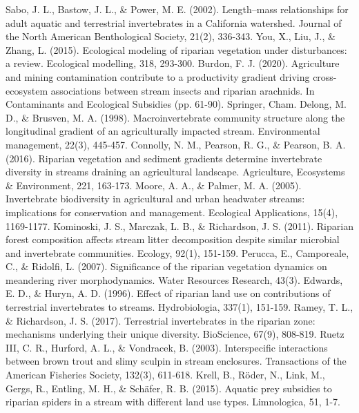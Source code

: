 \documentclass[12pt]{article}
\numberwithin{equation}{section}
\begin{document}
\begin{thebibliography}{99}
  Sabo, J. L., Bastow, J. L., \& Power, M. E. (2002). Length–mass relationships for adult aquatic and terrestrial invertebrates in a California watershed. Journal of the North American Benthological Society, 21(2), 336-343.
  You, X., Liu, J., \& Zhang, L. (2015). Ecological modeling of riparian vegetation under disturbances: a review. Ecological modelling, 318, 293-300.
  Burdon, F. J. (2020). Agriculture and mining contamination contribute to a productivity gradient driving cross-ecosystem associations between stream insects and riparian arachnids. In Contaminants and Ecological Subsidies (pp. 61-90). Springer, Cham.
  Delong, M. D., \& Brusven, M. A. (1998). Macroinvertebrate community structure along the longitudinal gradient of an agriculturally impacted stream. Environmental management, 22(3), 445-457.
  Connolly, N. M., Pearson, R. G., \& Pearson, B. A. (2016). Riparian vegetation and sediment gradients determine invertebrate diversity in streams draining an agricultural landscape. Agriculture, Ecosystems \& Environment, 221, 163-173.
  Moore, A. A., \& Palmer, M. A. (2005). Invertebrate biodiversity in agricultural and urban headwater streams: implications for conservation and management. Ecological Applications, 15(4), 1169-1177.
  Kominoski, J. S., Marczak, L. B., \& Richardson, J. S. (2011). Riparian forest composition affects stream litter decomposition despite similar microbial and invertebrate communities. Ecology, 92(1), 151-159.
  Perucca, E., Camporeale, C., \& Ridolfi, L. (2007). Significance of the riparian vegetation dynamics on meandering river morphodynamics. Water Resources Research, 43(3).
  Edwards, E. D., \& Huryn, A. D. (1996). Effect of riparian land use on contributions of terrestrial invertebrates to streams. Hydrobiologia, 337(1), 151-159.
  Ramey, T. L., \& Richardson, J. S. (2017). Terrestrial invertebrates in the riparian zone: mechanisms underlying their unique diversity. BioScience, 67(9), 808-819.
  Ruetz III, C. R., Hurford, A. L., \& Vondracek, B. (2003). Interspecific interactions between brown trout and slimy sculpin in stream enclosures. Transactions of the American Fisheries Society, 132(3), 611-618.
  Krell, B., Röder, N., Link, M., Gergs, R., Entling, M. H., \& Schäfer, R. B. (2015). Aquatic prey subsidies to riparian spiders in a stream with different land use types. Limnologica, 51, 1-7.

\end{thebibliography}
\end{document}
